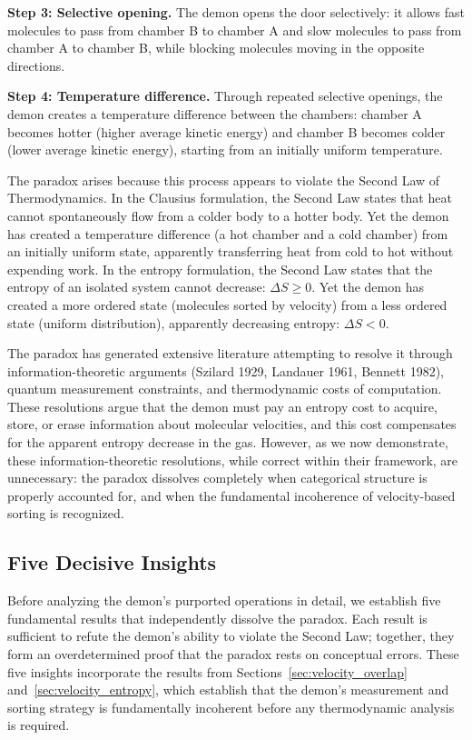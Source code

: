 \documentclass[12pt,a4paper]{article}
\theoremstyle{definition}
\theoremstyle{remark}
\begin{document}
\textbf{Step 3: Selective opening.} The demon opens the door selectively: it allows fast molecules to pass from chamber B to chamber A and slow molecules to pass from chamber A to chamber B, while blocking molecules moving in the opposite directions.

\textbf{Step 4: Temperature difference.} Through repeated selective openings, the demon creates a temperature difference between the chambers: chamber A becomes hotter (higher average kinetic energy) and chamber B becomes colder (lower average kinetic energy), starting from an initially uniform temperature.

The paradox arises because this process appears to violate the Second Law of Thermodynamics. In the Clausius formulation, the Second Law states that heat cannot spontaneously flow from a colder body to a hotter body. Yet the demon has created a temperature difference (a hot chamber and a cold chamber) from an initially uniform state, apparently transferring heat from cold to hot without expending work. In the entropy formulation, the Second Law states that the entropy of an isolated system cannot decrease: $\Delta S \geq 0$. Yet the demon has created a more ordered state (molecules sorted by velocity) from a less ordered state (uniform distribution), apparently decreasing entropy: $\Delta S < 0$.

The paradox has generated extensive literature attempting to resolve it through information-theoretic arguments (Szilard 1929, Landauer 1961, Bennett 1982), quantum measurement constraints, and thermodynamic costs of computation. These resolutions argue that the demon must pay an entropy cost to acquire, store, or erase information about molecular velocities, and this cost compensates for the apparent entropy decrease in the gas. However, as we now demonstrate, these information-theoretic resolutions, while correct within their framework, are unnecessary: the paradox dissolves completely when categorical structure is properly accounted for, and when the fundamental incoherence of velocity-based sorting is recognized.

\subsection{Five Decisive Insights}

Before analyzing the demon's purported operations in detail, we establish five fundamental results that independently dissolve the paradox. Each result is sufficient to refute the demon's ability to violate the Second Law; together, they form an overdetermined proof that the paradox rests on conceptual errors. These five insights incorporate the results from Sections~\ref{sec:velocity_overlap} and~\ref{sec:velocity_entropy}, which establish that the demon's measurement and sorting strategy is fundamentally incoherent before any thermodynamic analysis is required.
\end{document}
